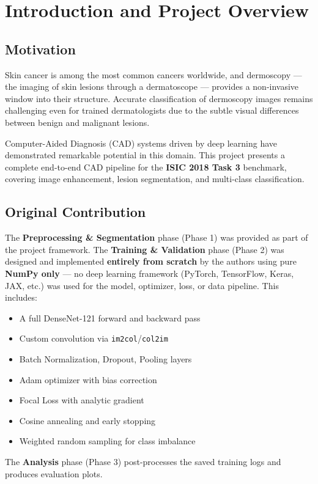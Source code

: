 \documentclass[12pt,a4paper]{report}
\begin{document}
\nopagecolor

\tableofcontents
\clearpage
\listoffigures
\listoftables
\clearpage

\chapter{Introduction and Project Overview}

\section{Motivation}

Skin cancer is among the most common cancers worldwide, and dermoscopy — the imaging of skin lesions through a dermatoscope — provides a non-invasive window into their structure. Accurate classification of dermoscopy images remains challenging even for trained dermatologists due to the subtle visual differences between benign and malignant lesions.

Computer-Aided Diagnosis (CAD) systems driven by deep learning have demonstrated remarkable potential in this domain. This project presents a complete end-to-end CAD pipeline for the \textbf{ISIC 2018 Task 3} benchmark, covering image enhancement, lesion segmentation, and multi-class classification.

\section{Original Contribution}

\begin{notebox}
The \textbf{Preprocessing \& Segmentation} phase (Phase 1) was provided as part of the project framework. The \textbf{Training \& Validation} phase (Phase 2) was designed and implemented \textbf{entirely from scratch} by the authors using pure \textbf{NumPy only} — no deep learning framework (PyTorch, TensorFlow, Keras, JAX, etc.) was used for the model, optimizer, loss, or data pipeline. This includes:
\begin{itemize}[nosep]
  \item A full DenseNet-121 forward and backward pass
  \item Custom convolution via \texttt{im2col}/\texttt{col2im}
  \item Batch Normalization, Dropout, Pooling layers
  \item Adam optimizer with bias correction
  \item Focal Loss with analytic gradient
  \item Cosine annealing and early stopping
  \item Weighted random sampling for class imbalance
\end{itemize}
The \textbf{Analysis} phase (Phase 3) post-processes the saved training logs and produces evaluation plots.
\end{notebox}
\end{document}
